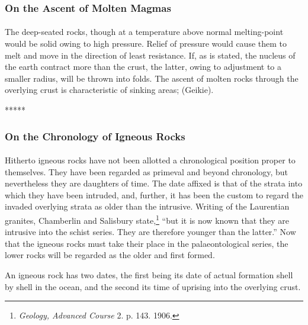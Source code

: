 \documentclass[a4paper, 12pt, oneside, landscape]{article}
\begin{document}
\subsubsection{On the Ascent of Molten Magmas}
\paragraph{}
The deep-seated rocks, though at a temperature above normal melting-point would be solid owing to high pressure. Relief of pressure would cause them to melt and move in the direction of least resistance. If, as is stated, the nucleus of the earth contract more than the crust, the latter, owing to adjustment to a smaller radius, will be thrown into folds. The ascent of molten rocks through the overlying crust is characteristic of sinking areas; (Geikie).

\centerline{*\hspace{15mm}*\hspace{15mm}*\hspace{15mm}*\hspace{15mm}*}
\bigskip

\subsubsection{On the Chronology of Igneous Rocks}
\paragraph{}
Hitherto igneous rocks have not been allotted a chronological position proper to themselves. They have been regarded as primeval and beyond chronology, but nevertheless they are daughters of time. The date affixed is that of the strata into which they have been intruded, and, further, it has been the custom to regard the invaded overlying strata as older than the intrusive. Writing of the Laurentian granites, Chamberlin and Salisbury state,\footnote{\emph{Geology, Advanced Course} 2. p. 143. 1906.} ``but it is now known that they are intrusive into the schist series. They are therefore younger than the latter.'' Now that the igneous rocks must take their place in the palaeontological series, the lower rocks will be regarded as the older and first formed.

An igneous rock has two dates, the first being its date of actual formation shell by shell in the ocean, and the second its time of uprising into the overlying crust.
\end{document}
